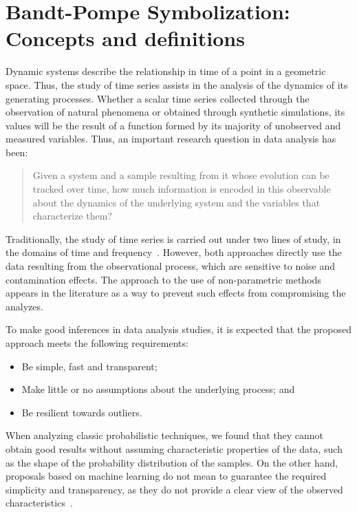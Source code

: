 \chapter{Bandt-Pompe Symbolization: Concepts and definitions}\label{chapter:BP}

Dynamic systems describe the relationship in time of a point in a geometric space.
Thus, the study of time series assists in the analysis of the dynamics of its generating processes.
Whether a scalar time series collected through the observation of natural phenomena or obtained through synthetic simulations, its values will be the result of a function formed by its majority of unobserved and measured variables.
Thus, an important research question in data analysis has been:
\begin{quote}
    Given a system and a sample resulting from it whose evolution can be tracked over time, how much information is encoded in this observable about the dynamics of the underlying system and the variables that characterize them?
\end{quote}
Traditionally, the study of time series is carried out under two lines of study, in the domains of time and frequency~\citep{BrockwellDavis91}.
However, both approaches directly use the data resulting from the observational process, which are sensitive to noise and contamination effects.
The approach to the use of non-parametric methods appears in the literature as a way to prevent such effects from compromising the analyzes.

To make good inferences in data analysis studies, it is expected that the proposed approach meets the following requirements:
\begin{itemize}
    \item Be simple, fast and transparent;
    \item Make little or no assumptions about the underlying process; and
    \item Be resilient towards outliers.
\end{itemize}
When analyzing classic probabilistic techniques, we found that they cannot obtain good results without assuming characteristic properties of the data, such as the shape of the probability distribution of the samples.
On the other hand, proposals based on machine learning do not mean to guarantee the required simplicity and transparency, as they do not provide a clear view of the observed characteristics~\citep{bandt2019small}.


